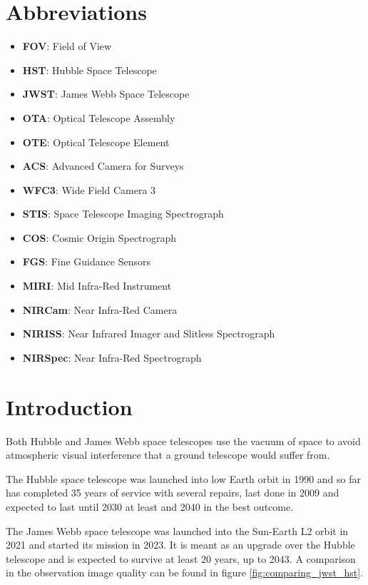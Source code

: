 \section{Abbreviations}

\begin{itemize}
    \item \textbf{FOV}: Field of View
    \item \textbf{HST}: Hubble Space Telescope
    \item \textbf{JWST}: James Webb Space Telescope
    \item \textbf{OTA}: Optical Telescope Assembly
    \item \textbf{OTE}: Optical Telescope Element
    \item \textbf{ACS}: Advanced Camera for Surveys
    \item \textbf{WFC3}: Wide Field Camera 3
    \item \textbf{STIS}: Space Telescope Imaging Spectrograph
    \item \textbf{COS}: Cosmic Origin Spectrograph
    \item \textbf{FGS}: Fine Guidance Sensors
    \item \textbf{MIRI}: Mid Infra-Red Instrument
    \item \textbf{NIRCam}: Near Infra-Red Camera
    \item \textbf{NIRISS}: Near Infrared Imager and Slitless Spectrograph
    \item \textbf{NIRSpec}: Near Infra-Red Spectrograph
\end{itemize}

\section{Introduction}

Both Hubble and James Webb space telescopes use the vacuum of space to avoid atmospheric visual interference that a ground telescope would suffer from.

The Hubble space telescope was launched into low Earth orbit in 1990 and so far has completed 35 years of service with several repairs, last done in 2009 and expected to last until 2030 at least and 2040 in the best outcome.

The James Webb space telescope was launched into the Sun-Earth L2 orbit in 2021 and started its mission in 2023. It is meant as an upgrade over the Hubble telescope and is expected to survive at least 20 years, up to 2043. A comparison in the observation image quality can be found in figure \ref{fig:comparing_jwst_hst}. 

